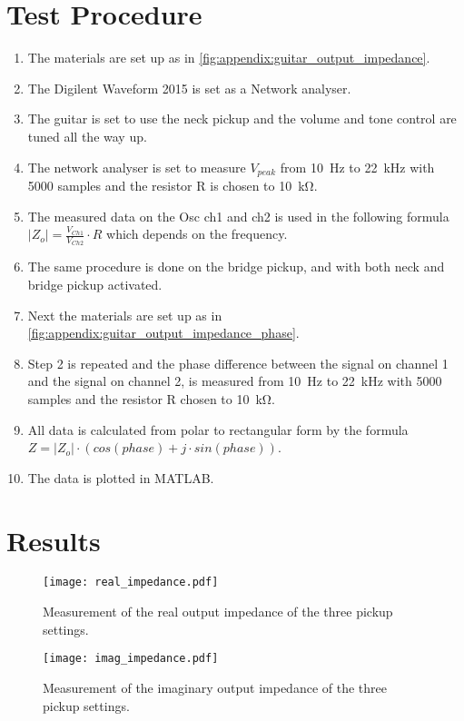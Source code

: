 \newpage

\section*{Test Procedure}


\begin{enumerate}
\item The materials are set up as in \autoref{fig:appendix:guitar_output_impedance}.
\item The Digilent Waveform 2015 is set as a Network analyser.
\item  The guitar is set to use the neck pickup and the volume and tone control are tuned all the way up.
\item  The network analyser is set to measure $V_{peak}$ from \SI{10}{\hertz} to \SI{22}{\kilo\hertz} with 5000 samples and the resistor R is chosen to \SI{10}{\kilo\ohm}.
\item The measured data on the Osc ch1 and ch2 is used in the following formula $\left | Z_o \right | = \frac{V_{Ch1}}{V_{Ch2}}\cdot R$ which depends on the frequency. 
\item The same procedure is done on the bridge pickup, and with both neck and bridge pickup activated.
\item Next the materials are set up as in \autoref{fig:appendix:guitar_output_impedance_phase}.
\item Step 2 is repeated and the  phase difference between the signal on channel 1 and the signal on channel 2, is measured from \SI{10}{\hertz} to \SI{22}{\kilo\hertz} with 5000 samples and the resistor R chosen to \SI{10}{\kilo\ohm}.
\item All data is calculated from polar to rectangular form by the formula $Z=\left | Z_o \right | \cdot (cos(phase) + j \cdot sin(phase))$.
\item The data is plotted in MATLAB.
\end{enumerate}

\newpage
\section*{Results}

\begin{figure}[htbp!]
	\centering
		\texttt{[image: real\_impedance.pdf]}
		\caption{Measurement of the real output impedance of the three pickup settings.}
		\label{fig:appendix:real_impedance}
		\texttt{[image: imag\_impedance.pdf]}
		\caption{Measurement of the imaginary output impedance of the three pickup settings.}
		\label{fig:appendix:imaginary_impedance}
\end{figure}


